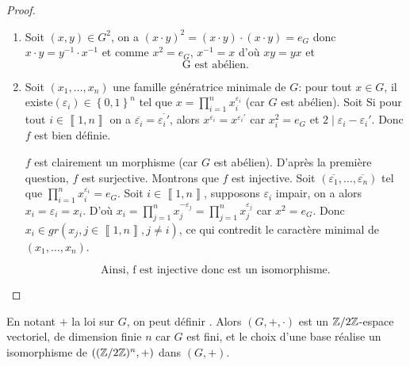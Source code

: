 \documentclass[12pt]{article}
\begin{document}
\begin{proof}
	\phantom{}
	\begin{enumerate}
		\item Soit $(x,y)\in G^{2}$, on a $(x\cdot y)^{2}=(x\cdot y)\cdot (x\cdot y)=e_{G}$ donc $x\cdot y=y^{-1}\cdot x^{-1}$ et comme $x^{2}=e_{G}$, $x^{-1}=x$ d'où $xy=yx$ et 
		\begin{equation}
			\boxed{\text{G est abélien.}}
		\end{equation}
		
		\item Soit $(x_{1},\dots,x_{n})$ une famille génératrice minimale de $G$: pour tout $x\in G$, il existe$(\varepsilon_{i})\in\left\{0,1\right\}^{n}$ tel que $x=\prod_{i=1}^{n}x_{i}^{\varepsilon_{i}}$ (car $G$ est abélien).
		Soit 
		Si pour tout $i\in\left\llbracket 1,n\right\rrbracket$ on a $\overline{\varepsilon_{i}}=\overline{\varepsilon_{i}'}$, alors $x^{\varepsilon_{i}}=x^{\varepsilon_{i}'}$ car $x_{i}^{2}=e_{G}$ et $2\mid\varepsilon_{i}-\varepsilon_{i}'$. Donc $f$ est bien définie.

		$f$ est clairement un morphisme (car $G$ est abélien). D'après la première question, $f$ est surjective. Montrons que $f$ est injective. Soit $(\overline{\varepsilon_{1}},\dots,\overline{\varepsilon_{n}})$ tel que $\prod_{i=1}^{n}x_{i}^{\varepsilon_{i}}=e_{G}$. Soit $i\in\left\llbracket 1,n\right\rrbracket$, supposons $\varepsilon_{i}$ impair, on a alors $x_{i}=\varepsilon_{i}=x_{i}$. D'où $x_{i}=\prod_{j=1}^{n}x_{j}^{-\varepsilon_{j}}=\prod_{j=1}^{n}x_{j}^{\varepsilon_{j}}$ car $x^{2}=e_{G}$. Donc $x_{i}\in gr(x_{j},j\in\left\llbracket 1,n\right\rrbracket, j\neq i)$, ce qui contredit le caractère minimal de $(x_{1},\dots,x_{n})$. 
		
		\begin{equation}
			\boxed{\text{Ainsi, f est injective donc est un isomorphisme.}}
		\end{equation}
	\end{enumerate}
\end{proof}

\begin{remark}
	En notant $+$ la loi sur $G$, on peut définir . Alors $(G,+,\cdot)$ est un $\mathbb{Z}/2\mathbb{Z}$-espace vectoriel, de dimension finie $n$ car $G$ est fini, et le choix d'une base réalise un isomorphisme de $((\mathbb{Z}/2\mathbb{Z})^{n},+)$ dans $(G,+)$.
\end{remark}
\end{document}
